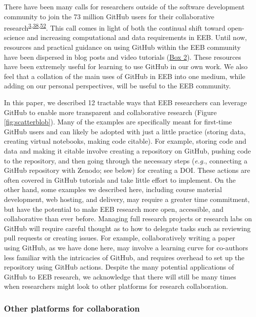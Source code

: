 There have been many calls for researchers outside of the software development community to join the 73 million GitHub users for their collaborative research\textsuperscript{\protect\hyperlink{ref-10ghgV3S8}{3},\protect\hyperlink{ref-1Du6fzB8g}{38},\protect\hyperlink{ref-UsTxAq4f}{52}}.
This call comes in light of both the continual shift toward open-science and increasing computational and data requirements in EEB.
Until now, resources and practical guidance on using GitHub within the EEB community have been dispersed in blog posts and video tutorials (\protect\hyperlink{tips}{Box 2}).
These resources have been extremely useful for learning to use GitHub in our own work.
We also feel that a collation of the main uses of GitHub in EEB into one medium, while adding on our personal perspectives, will be useful to the EEB community.

In this paper, we described 12 tractable ways that EEB researchers can leverage GitHub to enable more transparent and collaborative research (Figure \ref{fig:scatterblob}).
Many of the examples are specifically meant for first-time GitHub users and can likely be adopted with just a little practice (storing data, creating virtual notebooks, making code citable).
For example, storing code and data and making it citable involve creating a repository on GitHub, pushing code to the repository, and then going through the necessary steps (\emph{e.g.}, connecting a GitHub repository with Zenodo; see below) for creating a DOI.
These actions are often covered in GitHub tutorials and take little effort to implement.
On the other hand, some examples we described here, including course material development, web hosting, and delivery, may require a greater time commitment, but have the potential to make EEB research more open, accessible, and collaborative than ever before.
Managing full research projects or research labs on GitHub will require careful thought as to how to delegate tasks such as reviewing pull requests or creating issues.
For example, collaboratively writing a paper using GitHub, as we have done here, may involve a learning curve for co-authors less familiar with the intricacies of GitHub, and requires overhead to set up the repository using GitHub actions.
Despite the many potential applications of GitHub to EEB research, we acknowledge that there will still be many times when researchers might look to other platforms for research collaboration.

\hypertarget{other-platforms-for-collaboration}{%
\subsubsection{Other platforms for collaboration}\label{other-platforms-for-collaboration}}

